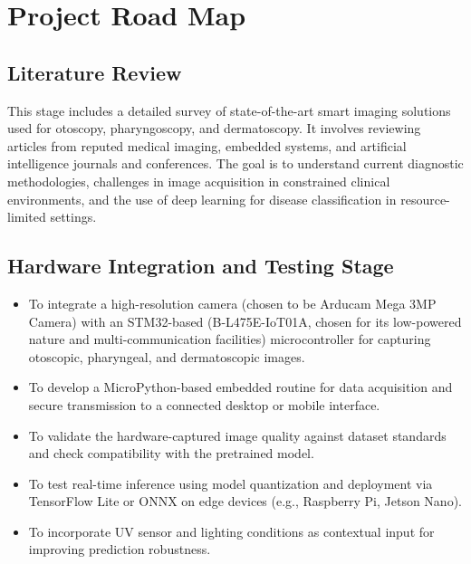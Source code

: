 \chapter{Project Road Map}

\section{Literature Review}
This stage includes a detailed survey of state-of-the-art smart imaging solutions used for otoscopy, pharyngoscopy, and dermatoscopy. It involves reviewing articles from reputed medical imaging, embedded systems, and artificial intelligence journals and conferences. The goal is to understand current diagnostic methodologies, challenges in image acquisition in constrained clinical environments, and the use of deep learning for disease classification in resource-limited settings.

\section{Hardware Integration and Testing Stage}
\begin{itemize}
\item To integrate a high-resolution camera (chosen to be Arducam Mega 3MP Camera) with an STM32-based (B-L475E-IoT01A, chosen for its low-powered nature and multi-communication facilities) microcontroller for capturing otoscopic, pharyngeal, and dermatoscopic images.
\item To develop a MicroPython-based embedded routine for data acquisition and secure transmission to a connected desktop or mobile interface.
\item To validate the hardware-captured image quality against dataset standards and check compatibility with the pretrained model.
\item To test real-time inference using model quantization and deployment via TensorFlow Lite or ONNX on edge devices (e.g., Raspberry Pi, Jetson Nano).
\item To incorporate UV sensor and lighting conditions as contextual input for improving prediction robustness.
\end{itemize}

